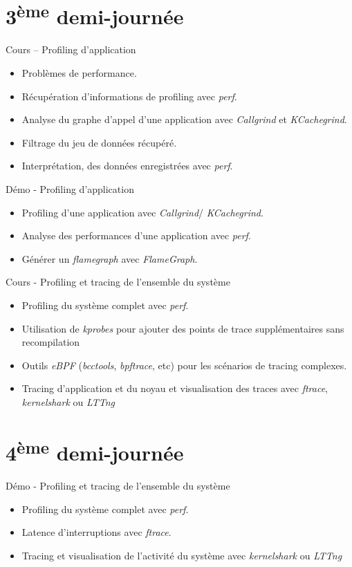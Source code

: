 \documentclass[a4paper,12pt,obeyspaces,spaces,hyphens]{article}
\begin{document}
\section{3\textsuperscript{ème} demi-journée}

\feagendatwocolumn
{Cours – Profiling d'application}
{
  \begin{itemize}
  \item Problèmes de performance.
  \item Récupération d'informations de profiling avec {\em perf}.
  \item Analyse du graphe d'appel d'une application avec {\em
      Callgrind} et {\em KCachegrind}.
  \item Filtrage du jeu de données récupéré.
  \item Interprétation, des données enregistrées avec {\em perf}.
  \end{itemize}
}
{Démo - Profiling d'application}
{
  \begin{itemize}
  \item Profiling d'une application avec {\em Callgrind}/{\em
      KCachegrind}.
  \item Analyse des performances d'une application avec {\em perf}.
  \item Générer un {\em flamegraph} avec {\em FlameGraph}.
  \end{itemize}
}

\feagendaonecolumn
{Cours - Profiling et tracing de l'ensemble du système}
{
  \begin{itemize}
  \item Profiling du système complet avec {\em perf}.
  \item Utilisation de {\em kprobes} pour ajouter des points de trace
    supplémentaires sans recompilation
  \item Outils {\em eBPF} ({\em bcctools}, {\em bpftrace}, etc) pour
    les scénarios de tracing complexes.
  \item Tracing d'application et du noyau et visualisation des traces
    avec {\em ftrace}, {\em kernelshark} ou {\em LTTng}
  \end{itemize}
}

\section{4\textsuperscript{ème} demi-journée}

\feagendaonecolumn
{Démo - Profiling et tracing de l'ensemble du système}
{
  \begin{itemize}
  \item Profiling du système complet avec {\em perf}.
  \item Latence d'interruptions avec {\em ftrace}.
  \item Tracing et visualisation de l'activité du système avec {\em
      kernelshark} ou {\em LTTng}
  \end{itemize}
}
\end{document}
